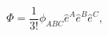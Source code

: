 \begin{equation}
\Phi=\frac{1}{3!} \phi_{ABC} \hat{e}^A\hat{e}^B\hat{e}^C , \label{Phi}
\end{equation}

